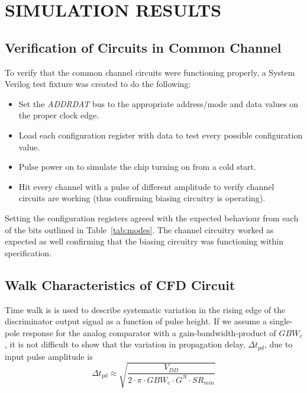 \documentclass[12pt,oneside,final]{siuethesis}
\theoremstyle{definition}
\begin{document}
\chapter{SIMULATION RESULTS}

\section{Verification of Circuits in Common Channel}
\par To verify that the common channel circuits were functioning properly, a System Verilog test fixture was created to do the following:
\begin{itemize}
\item Set the \emph{ADDRDAT} bus to the appropriate address/mode and data values on the proper clock edge.
\item Load each configuration register with data to test every possible configuration value.
\item Pulse power on to simulate the chip turning on from a cold start.
\item Hit every channel with a pulse of different amplitude to verify channel circuits are working (thus confirming biasing circuitry is operating).
\end{itemize}

\par Setting the configuration registers agreed with the expected behaviour from each of the bits outlined in Table~\ref{tab:modes}. The channel circuitry worked as expected as well confirming that the biasing circuitry was functioning within specification.

\section{Walk Characteristics of CFD Circuit}
\par Time walk is is used to describe systematic variation in the rising edge of the discriminator output signal as a function of pulse height.  If we assume a single-pole response for the analog comparator with a gain-bandwidth-product of $GBW_c$, it is not difficult to show that the variation in propagation delay, $\Delta t_{pd}$, due to input pulse amplitude is 
\begin{equation}
\Delta t_{pd} \approx  \sqrt{\frac{V_{DD}}{2 \cdot \pi \cdot GBW_c \cdot G^N \cdot SR_{min}}}
\end{equation}
\end{document}

